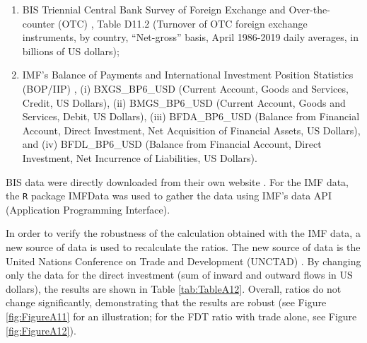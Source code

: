 \documentclass[a4paper, twoside]{templates/ociamthesis}
\begin{document}
\begin{enumerate}
\def\labelenumi{\arabic{enumi}.}
\item
  BIS Triennial Central Bank Survey of Foreign Exchange and Over-the-counter (OTC) \autocite{bankforinternationalsettlements2019}, Table D11.2 (Turnover of OTC foreign exchange instruments, by country, ``Net-gross'' basis, April 1986-2019 daily averages, in billions of US dollars);
\item
  IMF's Balance of Payments and International Investment Position Statistics (BOP/IIP) \autocite{internationalmonetaryfund2021}, (i) BXGS\_BP6\_USD (Current Account, Goods and Services, Credit, US Dollars), (ii) BMGS\_BP6\_USD (Current Account, Goods and Services, Debit, US Dollars), (iii) BFDA\_BP6\_USD (Balance from Financial Account, Direct Investment, Net Acquisition of Financial Assets, US Dollars), and (iv) BFDL\_BP6\_USD (Balance from Financial Account, Direct Investment, Net Incurrence of Liabilities, US Dollars).
\end{enumerate}

BIS data were directly downloaded from their own website \autocite{bankforinternationalsettlements2021a}. For the IMF data, the \texttt{R} package IMFData \autocite{lee2016} was used to gather the data using IMF's data API (Application Programming Interface).

In order to verify the robustness of the calculation obtained with the IMF data, a new source of data is used to recalculate the ratios. The new source of data is the United Nations Conference on Trade and Development (UNCTAD) \autocite{unctadstat2021}. By changing only the data for the direct investment (sum of inward and outward flows in US dollars), the results are shown in Table \ref{tab:TableA12}. Overall, ratios do not change significantly, demonstrating that the results are robust (see Figure \ref{fig:FigureA11} for an illustration; for the FDT ratio with trade alone, see Figure \ref{fig:FigureA12}).
\end{document}
